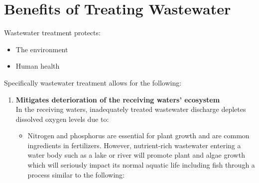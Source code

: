 \section{Benefits of Treating Wastewater}
Wastewater treatment protects:
\begin{itemize}
\item The environment
\item Human health
\end{itemize}

Specifically wastewater treatment allows for the following:

\begin{enumerate}
\item \textbf{Mitigates deterioration of the receiving waters' ecosystem }\\
In the receiving waters, inadequately treated wastewater discharge depletes dissolved oxygen levels due to:

\begin{itemize}

\item Nitrogen and phosphorus are essential for plant growth and are common ingredients in fertilizers. However, nutrient-rich wastewater entering a water body such as a lake or river will promote plant and algae growth which will seriously impact its normal aquatic life including fish through a process similar to the following:


\end{itemize}
\end{enumerate}
